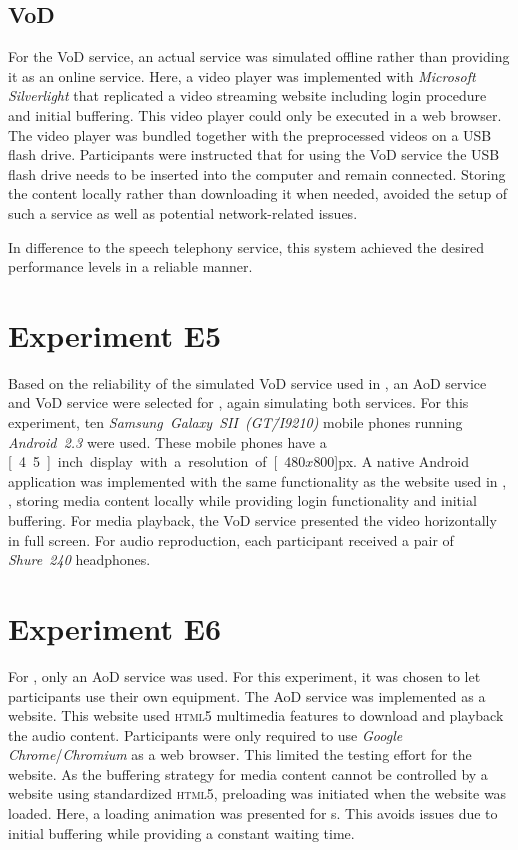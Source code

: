 \subsection{\acl{VoD}}
For the \ac{VoD} service, an actual service was simulated offline rather than providing it as an online service.
Here, a video player was implemented with \emph{Microsoft Silverlight} that replicated a video streaming website including login procedure and initial buffering.
This video player could only be executed in a web browser.
The video player was bundled together with the preprocessed videos on a \acs{USB} flash drive.
Participants were instructed that for using the \ac{VoD} service the \acs{USB} flash drive needs to be inserted into the computer and remain connected.
Storing the content locally rather than downloading it when needed, avoided the setup of such a service as well as potential network-related issues.

In difference to the speech telephony service, this system achieved the desired performance levels in a reliable manner.

\section{Experiment E5}
Based on the reliability of the simulated \ac{VoD} service used in , an \ac{AoD} service and \ac{VoD} service were selected for , again simulating both services.
For this experiment, ten \emph{Samsung~Galaxy~SII~(GT\=/I9210)} mobile phones running \emph{Android~2.3} were used.
These mobile phones have a \unit[4.5]{inch} display with a resolution of \unit[480$x$800]{px}.
A native Android application was implemented with the same functionality as the website used in , \ie, storing media content locally while providing login functionality and initial buffering.
For media playback, the \ac{VoD} service presented the video horizontally in full screen.
For audio reproduction, each participant received a pair of \emph{Shure~240} headphones.

\section{Experiment E6}
For , only an \ac{AoD} service was used.
For this experiment, it was chosen to let participants use their own equipment.
The \ac{AoD} service was implemented as a website.
This website used \textsc{\lowercase{HTML5}} multimedia features to download and playback the audio content.
Participants were only required to use \emph{Google Chrome}/\emph{Chromium} as a web browser.
This limited the testing effort for the website.
As the buffering strategy for media content cannot be controlled by a website using standardized \textsc{\lowercase{HTML5}}, preloading was initiated when the website was loaded.
Here, a loading animation was presented for \unit[5]{s}.
This avoids issues due to initial buffering while providing a constant waiting time.


